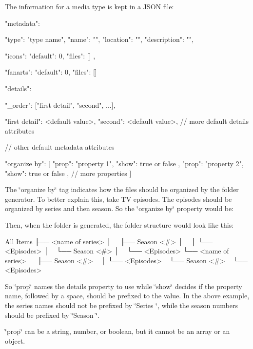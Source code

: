 The information for a media type is kept in a J\-S\-O\-N file\-: \begin{DoxyVerb}{
    "metadata": {
        "type": "type name",
        "name": "",
        "location": "",
        "description": "",

        "icons": {
            "default": 0,
            "files": []
        },

        "fanarts": {
            "default": 0,
            "files": []
        }

        "details": {
            "_order": ["first detail", "second", ...],

            "first detail": <default value>,
            "second": <default value>,
            // more default details attributes
        }

        // other default metadata attributes
    }

    "organize by": [
        { "prop": "property 1", "show": true or false },
        { "prop": "property 2", "show": true or false },
        // more properties
    ]
}
\end{DoxyVerb}


The {\ttfamily \char`\"{}organize by\char`\"{}} tag indicates how the files should be organized by the folder generator. To better explain this, take T\-V episodes. The episodes should be organized by series and then season. So the {\ttfamily \char`\"{}organize by\char`\"{}} property would be\-: \begin{DoxyVerb}
\end{DoxyVerb}


Then, when the folder is generated, the folder structure would look like this\-: \begin{DoxyVerb}All Items
├── <name of series>
│   ├── Season <#>
│   │   └── <Episodes>
│   └── Season <#>
│       └── <Episodes>
└── <name of series>
    ├── Season <#>
    │   └── <Episodes>
    └── Season <#>
        └── <Episodes>
\end{DoxyVerb}


So {\ttfamily \char`\"{}prop\char`\"{}} names the details property to use while {\ttfamily \char`\"{}show\char`\"{}} decides if the property name, followed by a space, should be prefixed to the value. In the above example, the series names should not be prefixed by \char`\"{}\-Series \char`\"{}, while the season numbers should be prefixed by \char`\"{}\-Season \char`\"{}.

{\ttfamily \char`\"{}prop\char`\"{}} can be a string, number, or boolean, but it cannot be an array or an object.

